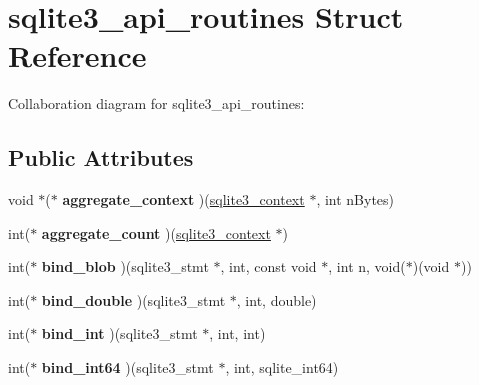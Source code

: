 \hypertarget{structsqlite3__api__routines}{\section{sqlite3\+\_\+api\+\_\+routines Struct Reference}
\label{structsqlite3__api__routines}
}


Collaboration diagram for sqlite3\+\_\+api\+\_\+routines\+:
\subsection*{Public Attributes}
\begin{DoxyCompactItemize}
\item 
\hypertarget{structsqlite3__api__routines_a16fafb5f2460657f528338aee5f65d25}{void $\ast$($\ast$ {\bfseries aggregate\+\_\+context} )(\hyperlink{structsqlite3__context}{sqlite3\+\_\+context} $\ast$, int n\+Bytes)}\label{structsqlite3__api__routines_a16fafb5f2460657f528338aee5f65d25}

\item 
\hypertarget{structsqlite3__api__routines_a8373f7a5dd2d6f1c86bbf024b1796156}{int($\ast$ {\bfseries aggregate\+\_\+count} )(\hyperlink{structsqlite3__context}{sqlite3\+\_\+context} $\ast$)}\label{structsqlite3__api__routines_a8373f7a5dd2d6f1c86bbf024b1796156}

\item 
\hypertarget{structsqlite3__api__routines_afeb41d70ab5a221fec488560934c825b}{int($\ast$ {\bfseries bind\+\_\+blob} )(sqlite3\+\_\+stmt $\ast$, int, const void $\ast$, int n, void($\ast$)(void $\ast$))}\label{structsqlite3__api__routines_afeb41d70ab5a221fec488560934c825b}

\item 
\hypertarget{structsqlite3__api__routines_aca43a229ce28397ba8c18a4d6e03e40c}{int($\ast$ {\bfseries bind\+\_\+double} )(sqlite3\+\_\+stmt $\ast$, int, double)}\label{structsqlite3__api__routines_aca43a229ce28397ba8c18a4d6e03e40c}

\item 
\hypertarget{structsqlite3__api__routines_a6fef49e6c9c1fa573c55cc6668a8448f}{int($\ast$ {\bfseries bind\+\_\+int} )(sqlite3\+\_\+stmt $\ast$, int, int)}\label{structsqlite3__api__routines_a6fef49e6c9c1fa573c55cc6668a8448f}

\item 
\hypertarget{structsqlite3__api__routines_a489304cada65abca390da9b751da8800}{int($\ast$ {\bfseries bind\+\_\+int64} )(sqlite3\+\_\+stmt $\ast$, int, sqlite\+\_\+int64)}\label{structsqlite3__api__routines_a489304cada65abca390da9b751da8800}


\end{DoxyCompactItemize}
